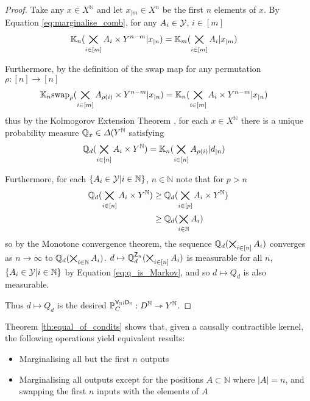 \begin{proof}
Take any $x\in X^{\mathbb{N}}$ and let $x_{|m}\in X^n$ be the first $n$ elements of $x$. By Equation \ref{eq:marginalise_comb}, for any $A_i\in \mathcal{Y}$, $i\in [m]$
\begin{align}
    \mathbb{K}_n(\bigtimes_{i\in [m]}A_i\times Y^{n-m}|x_{|n}) &= \mathbb{K}_m(\bigtimes_{i\in [m]}A_i|x_{|m})
\end{align}

Furthermore, by the definition of the $\mathrm{swap}$ map for any permutation $\rho:[n]\to[n]$
\begin{align}
    \mathbb{K}_n\mathrm{swap}_{\rho}(\bigtimes_{i\in [m]}A_{\rho(i)}\times Y^{n-m}|x_{|n}) &= \mathbb{K}_n(\bigtimes_{i\in [m]}A_{i}\times Y^{n-m}|x_{|n})
\end{align}
thus by the Kolmogorov Extension Theorem \citep{cinlar_probability_2011}, for each $x\in X^{\mathbb{N}}$ there is a unique probability measure $\mathbb{Q}_x\in \Delta(Y^{\mathbb{N}}$ satisfying
\begin{align}
    \mathbb{Q}_d(\bigtimes_{i\in [n]}A_i\times Y^{\mathbb{N}}) &= \mathbb{K}_n(\bigtimes_{i\in [n]}A_{\rho(i)}|d_{|n})\label{eq:q_is_Markov}
\end{align}

Furthermore, for each $\{A_i\in\mathcal{Y}|i\in \mathbb{N}\}$, $n\in \mathbb{N}$ note that for $p>n$
\begin{align}
\mathbb{Q}_d(\bigtimes_{i\in[n]} A_i \times Y^{\mathbb{N}})&\geq \mathbb{Q}_d(\bigtimes_{i\in [p]} A_i\times Y^{\mathbb{N}})\\
&\geq \mathbb{Q}_d(\bigtimes_{i\in \mathbb{N}} A_i)
\end{align}
so by the Monotone convergence theorem, the sequence $\mathbb{Q}_d(\bigtimes_{i\in[n]} A_i)$ converges as $n\to \infty$ to $\mathbb{Q}_d(\bigtimes_{i\in\mathbb{N}} A_i)$. $d\mapsto \mathbb{Q}_d^{\mathsf{Z}_n}(\bigtimes_{i\in[n]} A_i)$ is measurable for all $n$, $\{A_i\in\mathcal{Y}|i\in \mathbb{N}\}$ by Equation \ref{eq:q_is_Markov}, and so $d\mapsto Q_d$ is also measurable.

Thus $d\mapsto Q_d$ is the desired $\mathbb{P}_C^{\mathsf{Y}_{\mathbb{N}}\wr \mathsf{D}_{\mathbb{N}}}:D^\mathbb{N}\rightarrowtriangle Y^\mathbb{N}$.
\end{proof}

Theorem \ref{th:equal_of_condits} shows that, given a causally contractible kernel, the following operations yield equivalent results:
\begin{itemize}
    \item Marginalising all but the first $n$ outputs
    \item Marginalising all outputs except for the positions $A\subset\mathbb{N}$ where $|A|=n$, and swapping the first $n$ inputs with the elements of $A$
\end{itemize}

